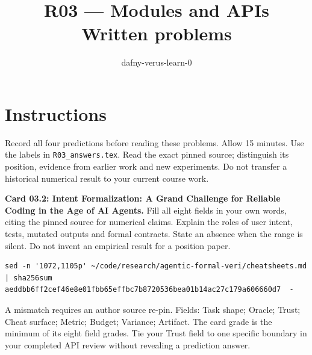 \documentclass[11pt]{article}
\title{R03 --- Modules and APIs \\ \large Written problems}
\author{dafny-verus-learn-0}
\date{}
\begin{document}
\maketitle
\section*{Instructions}
Record all four predictions before reading these problems. Allow 15 minutes.
Use the labels in \texttt{R03\_answers.tex}. Read the exact pinned source;
distinguish its position, evidence from earlier work and new experiments.
Do not transfer a historical numerical result to your current course work.

\begin{problem}\label{prob:B1}
\textbf{Card 03.2: Intent Formalization: A Grand Challenge for Reliable Coding
in the Age of AI Agents.} Fill all eight fields in your own words, citing the
pinned source for numerical claims. Explain the roles of user intent, tests,
mutated outputs and formal contracts. State an absence when the range is
silent. Do not invent an empirical result for a position paper.
\begin{verbatim}
sed -n '1072,1105p' ~/code/research/agentic-formal-veri/cheatsheets.md | sha256sum
aeddbb6ff2cef46e8e01fbb65effbc7b8720536bea01b14ac27c179a606660d7  -
\end{verbatim}
A mismatch requires an author source re-pin. Fields: Task shape; Oracle;
Trust; Cheat surface; Metric; Budget; Variance; Artifact. The card grade is
the minimum of its eight field grades. Tie your Trust field to one specific
boundary in your completed API review without revealing a prediction answer.
\end{problem}
\end{document}
